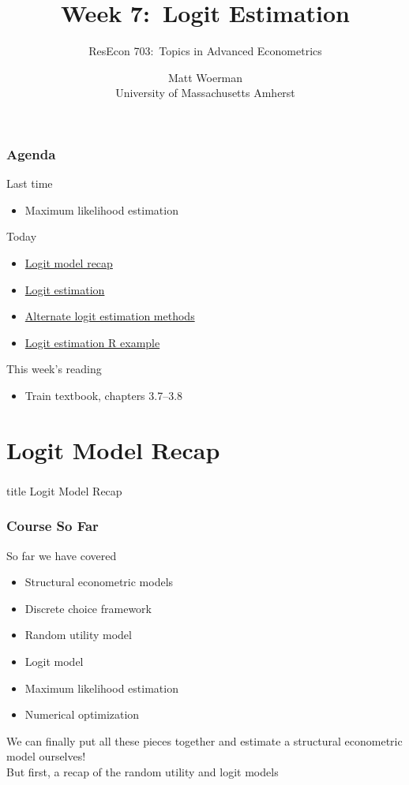 \documentclass{beamer}
\title[Week 7:\ Logit Estimation]{Week 7:\ Logit Estimation}
\author[ResEcon 703:\ Advanced Econometrics]{ResEcon 703:\ Topics in Advanced Econometrics}
\date{Matt Woerman\\University of Massachusetts Amherst}
\begin{document}
{ 
\begin{frame}[noframenumbering]
    \titlepage
\end{frame}
}

\begin{frame}\frametitle{Agenda}
    Last time
    \begin{itemize}
        \item Maximum likelihood estimation
    \end{itemize}
    \vspace{3ex}
    Today
    \begin{itemize}
    	\item \hyperlink{page.\getpagerefnumber{recap}}{Logit model recap}
        \item \hyperlink{page.\getpagerefnumber{estim}}{Logit estimation}
        \item \hyperlink{page.\getpagerefnumber{alt}}{Alternate logit estimation methods}
        \item \hyperlink{page.\getpagerefnumber{example}}{Logit estimation R example}
    \end{itemize}
    \vspace{3ex}
    This week's reading
    \begin{itemize}
        \item Train textbook, chapters 3.7--3.8
    \end{itemize}
\end{frame}

\section{Logit Model Recap}
\label{recap}
\begin{frame}\frametitle{}
    \vfill
    \centering
    \begin{beamercolorbox}[center]{title}
        \Large Logit Model Recap
    \end{beamercolorbox}
    \vfill
\end{frame}

\begin{frame}\frametitle{Course So Far}
    So far we have covered
    \begin{itemize}
    	\item Structural econometric models
    	\item Discrete choice framework
    	\item Random utility model
    	\item Logit model
    	\item Maximum likelihood estimation
    	\item Numerical optimization
    \end{itemize}
    \vspace{3ex}
    We can finally put all these pieces together and estimate a structural econometric model ourselves! \\
    \vspace{3ex}
    But first, a recap of the random utility and logit models
\end{frame}
\end{document}
